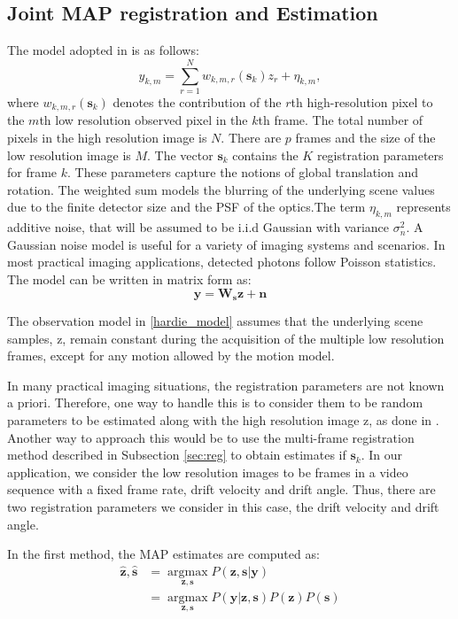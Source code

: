 \documentclass[10pt,twocolumn,letterpaper]{article}
\begin{document}
\subsection{Joint MAP registration and Estimation}

The model adopted in \cite{hardie1997joint} is as follows:
\begin{equation}\label{hardie_model}
    y_{k,m}=\sum\limits_{r=1}^N w_{k,m,r}(\bm{s}_k)z_r + \eta_{k,m},
\end{equation}
where $w_{k,m,r}(\bm{s}_k)$ denotes the contribution of the $r$th high-resolution pixel to the $m$th low resolution observed pixel in the $k$th frame. The total number of pixels in the high resolution image is $N$. There are $p$ frames and the size of the low resolution image is $M$. The vector $\bm{s}_k$ contains the $K$ registration parameters for frame $k$. These parameters capture the notions of global translation and rotation. The weighted sum models the blurring of the underlying scene values due to the finite detector size and the PSF of the optics.The term $\eta_{k,m}$ represents additive noise, that will be assumed to be i.i.d Gaussian with variance $\sigma_n^2$. A Gaussian noise model is useful for a variety of imaging systems and scenarios. In
most practical imaging applications, detected photons follow Poisson statistics. The model can be written in matrix form as:
\begin{equation}
    \mathbf{y} = \mathbf{W_s} \mathbf{z} + \mathbf{n}
\end{equation}{}

The observation model in \eqref{hardie_model} assumes that the underlying scene samples, z, remain constant during the acquisition of the multiple low resolution frames, except for any motion allowed by the motion model.

In many practical imaging situations, the registration parameters are not known a priori. Therefore, one way to handle this is to consider them to be random parameters to be estimated along with the high resolution image z, as done in \cite{hardie1997joint}. Another way to approach this would be to use the multi-frame registration method described in Subsection \ref{sec:reg} to obtain estimates if $\bm{s}_k$. In our application, we consider the low resolution images to be frames in a video sequence with a fixed frame rate, drift velocity and drift angle. Thus, there are two registration parameters we consider in this case, the drift velocity and drift angle. 

In the first method, the MAP estimates are computed as:
\begin{align}
    \hat{\mathbf{z}}, \hat{\mathbf{s}} &= \mathop{\arg\max}\limits_{\mathbf{z},\mathbf{s}} P(\mathbf{z}, \mathbf{s} | \mathbf{y}) \\
    &= \mathop{\arg\max}\limits_{\mathbf{z},\mathbf{s}} P(\mathbf{y}| \mathbf{z}, \mathbf{s}) P(\mathbf{z})P(\mathbf{s})
\end{align}{}
\end{document}
